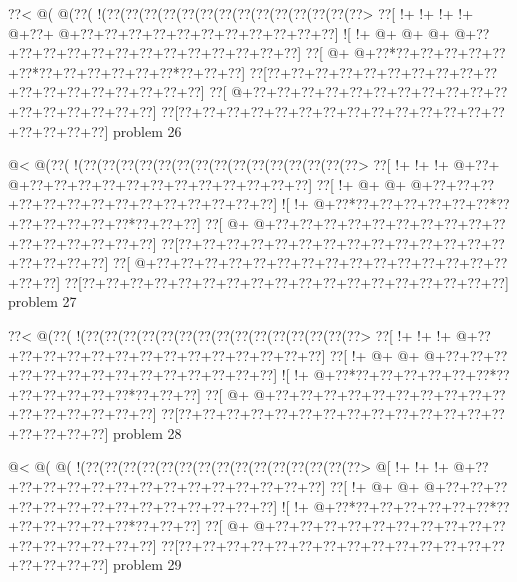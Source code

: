 \vbox{\vbox{\goo
\0??<\- @(\- @(\0??(\- !(\0??(\0??(\0??(\0??(\0??(\0??(\0??(\0??(\0??(\0??(\0??(\0??(\0??(\0??>
\0??[\- !+\- !+\- !+\- !+\- @+\0??+\- @+\0??+\0??+\0??+\0??+\0??+\0??+\0??+\0??+\0??+\0??+\0??]
\- ![\- !+\- @+\- @+\- @+\- @+\0??+\0??+\0??+\0??+\0??+\0??+\0??+\0??+\0??+\0??+\0??+\0??+\0??]
\0??[\- @+\- @+\0??*\0??+\0??+\0??+\0??+\0??+\0??*\0??+\0??+\0??+\0??+\0??+\0??*\0??+\0??+\0??]
\0??[\0??+\0??+\0??+\0??+\0??+\0??+\0??+\0??+\0??+\0??+\0??+\0??+\0??+\0??+\0??+\0??+\0??+\0??]
\0??[\- @+\0??+\0??+\0??+\0??+\0??+\0??+\0??+\0??+\0??+\0??+\0??+\0??+\0??+\0??+\0??+\0??+\0??]
\0??[\0??+\0??+\0??+\0??+\0??+\0??+\0??+\0??+\0??+\0??+\0??+\0??+\0??+\0??+\0??+\0??+\0??+\0??]
}
\hfil problem 26\hfil\break
}



\vbox{\vbox{\goo
\- @<\- @(\0??(\- !(\0??(\0??(\0??(\0??(\0??(\0??(\0??(\0??(\0??(\0??(\0??(\0??(\0??(\0??(\0??>
\0??[\- !+\- !+\- !+\- @+\0??+\- @+\0??+\0??+\0??+\0??+\0??+\0??+\0??+\0??+\0??+\0??+\0??+\0??]
\0??[\- !+\- @+\- @+\- @+\0??+\0??+\0??+\0??+\0??+\0??+\0??+\0??+\0??+\0??+\0??+\0??+\0??+\0??]
\- ![\- !+\- @+\0??*\0??+\0??+\0??+\0??+\0??+\0??*\0??+\0??+\0??+\0??+\0??+\0??*\0??+\0??+\0??]
\0??[\- @+\- @+\0??+\0??+\0??+\0??+\0??+\0??+\0??+\0??+\0??+\0??+\0??+\0??+\0??+\0??+\0??+\0??]
\0??[\0??+\0??+\0??+\0??+\0??+\0??+\0??+\0??+\0??+\0??+\0??+\0??+\0??+\0??+\0??+\0??+\0??+\0??]
\0??[\- @+\0??+\0??+\0??+\0??+\0??+\0??+\0??+\0??+\0??+\0??+\0??+\0??+\0??+\0??+\0??+\0??+\0??]
\0??[\0??+\0??+\0??+\0??+\0??+\0??+\0??+\0??+\0??+\0??+\0??+\0??+\0??+\0??+\0??+\0??+\0??+\0??]
}
\hfil problem 27\hfil\break
}



\vbox{\vbox{\goo
\0??<\- @(\0??(\- !(\0??(\0??(\0??(\0??(\0??(\0??(\0??(\0??(\0??(\0??(\0??(\0??(\0??(\0??(\0??>
\0??[\- !+\- !+\- !+\- @+\0??+\0??+\0??+\0??+\0??+\0??+\0??+\0??+\0??+\0??+\0??+\0??+\0??+\0??]
\0??[\- !+\- @+\- @+\- @+\0??+\0??+\0??+\0??+\0??+\0??+\0??+\0??+\0??+\0??+\0??+\0??+\0??+\0??]
\- ![\- !+\- @+\0??*\0??+\0??+\0??+\0??+\0??+\0??*\0??+\0??+\0??+\0??+\0??+\0??*\0??+\0??+\0??]
\0??[\- @+\- @+\0??+\0??+\0??+\0??+\0??+\0??+\0??+\0??+\0??+\0??+\0??+\0??+\0??+\0??+\0??+\0??]
\0??[\0??+\0??+\0??+\0??+\0??+\0??+\0??+\0??+\0??+\0??+\0??+\0??+\0??+\0??+\0??+\0??+\0??+\0??]
}
\hfil problem 28\hfil\break
}



\vbox{\vbox{\goo
\- @<\- @(\- @(\- !(\0??(\0??(\0??(\0??(\0??(\0??(\0??(\0??(\0??(\0??(\0??(\0??(\0??(\0??(\0??>
\- @[\- !+\- !+\- !+\- @+\0??+\0??+\0??+\0??+\0??+\0??+\0??+\0??+\0??+\0??+\0??+\0??+\0??+\0??]
\0??[\- !+\- @+\- @+\- @+\0??+\0??+\0??+\0??+\0??+\0??+\0??+\0??+\0??+\0??+\0??+\0??+\0??+\0??]
\- ![\- !+\- @+\0??*\0??+\0??+\0??+\0??+\0??+\0??*\0??+\0??+\0??+\0??+\0??+\0??*\0??+\0??+\0??]
\0??[\- @+\- @+\0??+\0??+\0??+\0??+\0??+\0??+\0??+\0??+\0??+\0??+\0??+\0??+\0??+\0??+\0??+\0??]
\0??[\0??+\0??+\0??+\0??+\0??+\0??+\0??+\0??+\0??+\0??+\0??+\0??+\0??+\0??+\0??+\0??+\0??+\0??]
}
\hfil problem 29\hfil\break
}



